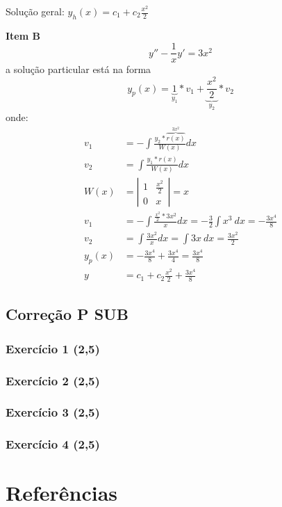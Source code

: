 \documentclass[12pt,openany, letterpaper]{book}
\newcommand{\E}[1]{Exercício #1}
\newcommand{\IT}[1]{Item {#1}}
\begin{document}
{{Solução geral: $y_h(x) = c_1 + c_2\frac{x^2}{2}$

\textbf{\IT{B}} $$y'' -\frac{1}{x}y' = 3x^2$$ a solução particular está na forma $$y_p(x) = \underbrace{1}_{y_1}*v_1 + \underbrace{\frac{x^2}{2}}_{y_2}*v_2$$ onde: \begin{align*}
    v_1 &= - \int \frac{y_2 * \overbrace{r(x)}^{3x^2}}{W(x)} dx \\
    v_2 &= \int \frac{y_1*r(x)}{W(x)}dx \\
    W(x) &= \left| \begin{array}{cc}
    1 & \frac{x^2}{2} \\
    0 & x
    \end{array}\right| = x \\
    v_1 &= -\int \frac{\frac{x^2}{2}*3x^2}{x}dx = -\frac{3}{2} \int x^3 \ dx= -\frac{3x^4}{8} \\
    v_2 &= \int \frac{3x^2}{x}dx = \int 3x\ dx = \frac{3x^2}{2} \\
    y_p(x) &= -\frac{3x^4}{8} + \frac{3x^4}{4} = \frac{3x^4}{8} \\
    y &= c_1 + c_2\frac{x^2}{2} + \frac{3x^4}{8}
\end{align*}


\chapter{Correção P SUB}
\label{C:SUB}

\section*{\E{1} (2,5)}

\newpage

\section*{\E{2} (2,5)}

\newpage

\section*{\E{3} (2,5)}

\newpage

\section*{\E{4} (2,5)}

\part{Referências}
\label{ref-3}

}}
\end{document}
